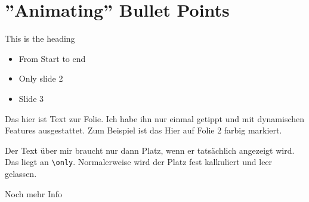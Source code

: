 \section{''Animating'' Bullet Points}
\begin{frame}{This is the heading}

\begin{itemize}
    \item <1-> From Start to end
    \item <2> Only slide 2
    \item <3-> Slide 3
\end{itemize}

Das hier ist Text zur Folie. Ich habe ihn nur einmal getippt und mit dynamischen Features ausgestattet. Zum Beispiel ist \alert<2>{das Hier auf Folie 2} farbig markiert.
\end{frame}

\begin{frame}[fragile]

\vspace{1em}

Der Text über mir braucht nur dann Platz, wenn er tatsächlich angezeigt wird. Das liegt an \verb|\only|. Normalerweise wird der Platz fest kalkuliert und leer gelassen.

\pause
Noch mehr Info

\end{frame}

